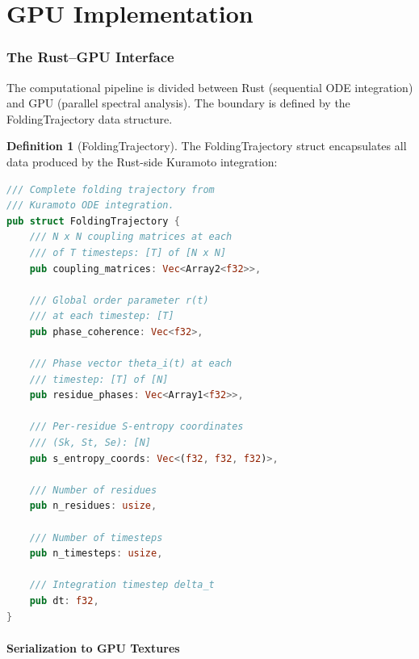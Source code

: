 \documentclass[11pt,twocolumn,a4paper]{article}
\theoremstyle{definition}
\newtheorem{definition}[theorem]{Definition}
\theoremstyle{remark}
\begin{document}
\part{GPU Implementation}

\section{The Rust--GPU Interface}
\label{sec:rust_gpu}

The computational pipeline is divided between Rust (sequential ODE integration) and GPU (parallel spectral analysis). The boundary is defined by the FoldingTrajectory data structure.

\begin{definition}[FoldingTrajectory]
\label{def:folding_trajectory}
The FoldingTrajectory struct encapsulates all data produced by the Rust-side Kuramoto integration:
\end{definition}

\begin{lstlisting}[language=Rust,caption={FoldingTrajectory struct definition},label=lst:folding_trajectory]
/// Complete folding trajectory from
/// Kuramoto ODE integration.
pub struct FoldingTrajectory {
    /// N x N coupling matrices at each
    /// of T timesteps: [T] of [N x N]
    pub coupling_matrices: Vec<Array2<f32>>,

    /// Global order parameter r(t)
    /// at each timestep: [T]
    pub phase_coherence: Vec<f32>,

    /// Phase vector theta_i(t) at each
    /// timestep: [T] of [N]
    pub residue_phases: Vec<Array1<f32>>,

    /// Per-residue S-entropy coordinates
    /// (Sk, St, Se): [N]
    pub s_entropy_coords: Vec<(f32, f32, f32)>,

    /// Number of residues
    pub n_residues: usize,

    /// Number of timesteps
    pub n_timesteps: usize,

    /// Integration timestep delta_t
    pub dt: f32,
}
\end{lstlisting}

\subsection{Serialization to GPU Textures}
\end{document}
